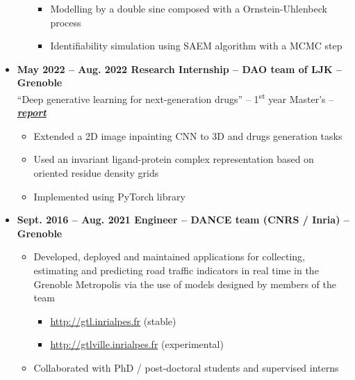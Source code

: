 \documentclass{article}
\begin{document}
\begin{minipage}{0.8\textwidth}
\begin{flushleft}
\begin{itemize}
\begin{itemize}[leftmargin=*]
\begin{itemize}[leftmargin=*]
                \item Modelling by a double sine composed with a Ornstein-Uhlenbeck process
                \item Identifiability simulation using SAEM algorithm with a MCMC step
            \end{itemize}
        \end{itemize}
        \item \textbf{May 2022 – Aug. 2022 \qquad Research Internship – DAO team of LJK – Grenoble} \\
        “Deep generative learning for next-generation drugs” – 1\textsuperscript{st} year Master’s – \textbf{\textit{ \href{https://vadmbertr.github.io/Deep-generative-learning-for-next-generation-drugs/Internship_report___Deep_generative_learning_for_next_generation_drugs.pdf}{report}}}
        \vspace{-.15cm}
        \begin{itemize}[leftmargin=*]
        \setlength\itemsep{.01cm}
            \item Extended a 2D image inpainting CNN to 3D and drugs generation tasks
            \item Used an invariant ligand-protein complex representation based on oriented residue density grids
            \item Implemented using PyTorch library
        \end{itemize}
        \item \textbf{Sept. 2016 – Aug. 2021 \qquad Engineer – DANCE team (CNRS / Inria) – Grenoble}
        \vspace{-.15cm}
        \begin{itemize}[leftmargin=*]
        \setlength\itemsep{.01cm}
            \item Developed, deployed and maintained applications for collecting, estimating and predicting road traffic indicators in real time in the Grenoble Metropolis via the use of models designed by members of the team
            \vspace{-.15cm}
            \begin{itemize}[leftmargin=*]
            \setlength\itemsep{.01cm}
                \item \url{http://gtl.inrialpes.fr} (stable)
                \item \url{http://gtlville.inrialpes.fr} (experimental)
            \end{itemize}
            \item Collaborated with PhD / post-doctoral students and supervised interns

\end{itemize}
\end{itemize}
\end{flushleft}
\end{minipage}
\end{document}
